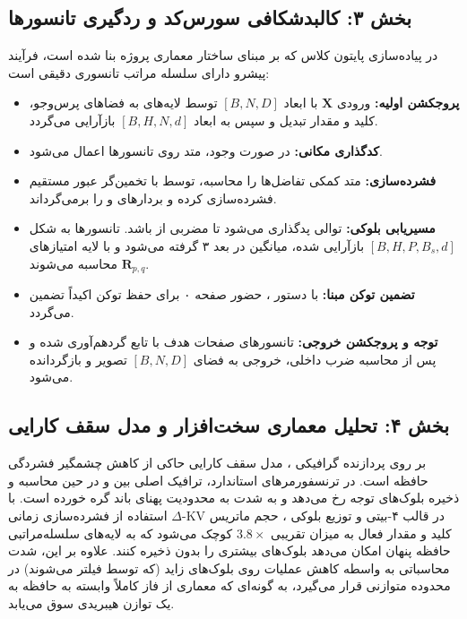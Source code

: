 \subsection*{بخش ۳: کالبدشکافی سورس‌کد و ردگیری تانسورها }
در پیاده‌سازی پایتون کلاس  که بر مبنای ساختار معماری پروژه بنا شده است، فرآیند پیشرو  دارای سلسله مراتب تانسوری دقیقی است:
\begin{itemize}
    \item \textbf{پروجکشن اولیه:} ورودی $\mathbf{X}$ با ابعاد $[B, N, D]$ توسط لایه‌های  به فضاهای پرس‌وجو، کلید و مقدار تبدیل و سپس به ابعاد $[B, H, N, d]$ بازآرایی می‌گردد.
    \item \textbf{کدگذاری مکانی:} در صورت وجود، متد  روی تانسورها اعمال می‌شود.
    \item \textbf{فشرده‌سازی:} متد کمکی  تفاضل‌ها را محاسبه، توسط  با تخمین‌گر عبور مستقیم فشرده‌سازی کرده و بردارهای  و  را برمی‌گرداند.
    \item \textbf{مسیریابی بلوکی:} توالی پدگذاری می‌شود تا مضربی از  باشد. تانسورها به شکل $[B, H, P, B_s, d]$ بازآرایی شده، میانگین در بعد ۳ گرفته می‌شود و با لایه  امتیازهای $\mathbf{R}_{p, q}$ محاسبه می‌شوند.
    \item \textbf{تضمین توکن مبنا:} با دستور ، حضور صفحه ۰ برای حفظ توکن \lr{[CLS]} اکیداً تضمین می‌گردد.
    \item \textbf{توجه و پروجکشن خروجی:} تانسورهای صفحات هدف با تابع  گردهم‌آوری شده و پس از محاسبه ضرب داخلی، خروجی به فضای $[B, N, D]$ تصویر و بازگردانده می‌شود.
\end{itemize}

\subsection*{بخش ۴: تحلیل معماری سخت‌افزار و مدل سقف کارایی }
بر روی پردازنده گرافیکی ، مدل سقف کارایی حاکی از کاهش چشمگیر فشردگی حافظه است. در ترنسفورمرهای استاندارد، ترافیک اصلی بین  و  در حین محاسبه و ذخیره بلوک‌های توجه رخ می‌دهد و به شدت به محدودیت پهنای باند گره خورده است. 
با استفاده از فشرده‌سازی زمانی $\Delta$-KV در قالب ۴-بیتی و توزیع بلوکی ، حجم ماتریس کلید و مقدار فعال به میزان تقریبی $3.8 \times$ کوچک می‌شود که به لایه‌های سلسله‌مراتبی حافظه پنهان  امکان می‌دهد بلوک‌های بیشتری را بدون  ذخیره کنند.
علاوه بر این، شدت محاسباتی  به واسطه کاهش عملیات روی بلوک‌های زاید (که توسط  فیلتر می‌شوند) در محدوده متوازنی قرار می‌گیرد، به گونه‌ای که معماری از فاز کاملاً وابسته به حافظه  به یک توازن هیبریدی سوق می‌یابد.

